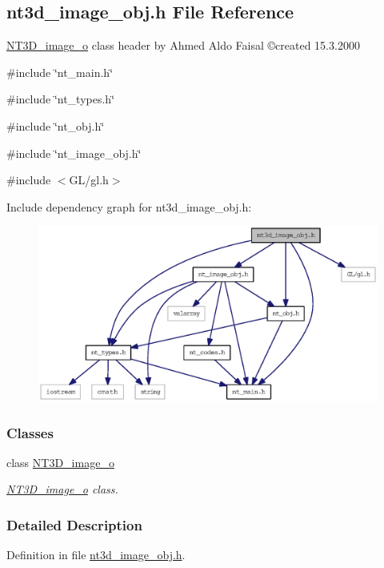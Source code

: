 \subsection{nt3d\_\-image\_\-obj.h File Reference}
\label{nt3d__image__obj_8h}



\begin{DoxyItemize}
\item \hyperlink{class_n_t3_d__image__o}{NT3D\_\-image\_\-o} class header by Ahmed Aldo Faisal \copyright created 15.3.2000 
\end{DoxyItemize} 


{\ttfamily \#include \char`\"{}nt\_\-main.h\char`\"{}}\par
{\ttfamily \#include \char`\"{}nt\_\-types.h\char`\"{}}\par
{\ttfamily \#include \char`\"{}nt\_\-obj.h\char`\"{}}\par
{\ttfamily \#include \char`\"{}nt\_\-image\_\-obj.h\char`\"{}}\par
{\ttfamily \#include $<$GL/gl.h$>$}\par
Include dependency graph for nt3d\_\-image\_\-obj.h:
\nopagebreak
\begin{figure}[H]
\begin{center}
\leavevmode
\includegraphics[width=400pt]{nt3d__image__obj_8h__incl}
\end{center}
\end{figure}
\subsubsection*{Classes}
\begin{DoxyCompactItemize}
\item 
class \hyperlink{class_n_t3_d__image__o}{NT3D\_\-image\_\-o}
\begin{DoxyCompactList}\small\item\em \hyperlink{class_n_t3_d__image__o}{NT3D\_\-image\_\-o} class. \item\end{DoxyCompactList}\end{DoxyCompactItemize}


\subsubsection{Detailed Description}


Definition in file \hyperlink{nt3d__image__obj_8h_source}{nt3d\_\-image\_\-obj.h}.

